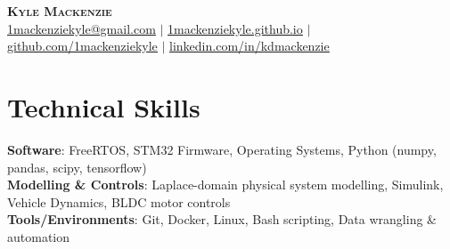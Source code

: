 \documentclass[letterpaper,11pt]{article}
\begin{document}

\begin{center}
\vspace*{-1.0cm}
    \textbf{\Huge \scshape Kyle Mackenzie} \\ \vspace{1pt}
    \href{mailto:1mackenziekyle@gmail.com}{\underline{1mackenziekyle@gmail.com}} $|$
    \small \href{https://1mackenziekyle.github.io}{\underline{1mackenziekyle.github.io}} $|$
    \small \href{https://github.com/1mackenziekyle}{\underline{github.com/1mackenziekyle}} $|$
    \href{https://www.linkedin.com/in/kdmackenzie/}{\underline{linkedin.com/in/kdmackenzie}}  
    
    
\end{center}

 
  
%
\section{Technical Skills}

 \begin{itemize}[leftmargin=0.15in, label={}]
    \small{\item{
     \textbf{Software}{: FreeRTOS, STM32 Firmware, Operating Systems, Python (numpy, pandas, scipy, tensorflow) }\\
     \textbf{Modelling \& Controls}{: Laplace-domain physical system modelling, Simulink, Vehicle Dynamics, BLDC motor controls} \\
     \textbf{Tools/Environments}{: Git, Docker, Linux, Bash scripting, Data wrangling \& automation} \\
    }}
 \end{itemize}

\vspace{-4mm}

\end{document}
